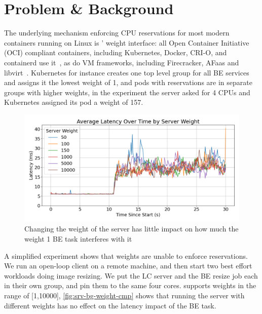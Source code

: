 
\section{Problem \& Background}

The underlying mechanism enforcing CPU reservations for most modern containers
running on Linux is \cgroups{}' weight interface: all Open Container Initiative
(OCI) compliant containers, including Kubernetes, Docker, CRI-O, and containerd
use it~\cite{oci-cgroups, docker-docs-cgroups, container-isolation-article}, as
do VM frameworks, including Firecracker, AFaas and
libvirt~\cite{firecracker-cgroups,afaas,libvirt-cgroups}. Kubernetes for
instance creates one top level group for all BE services and assigns it the
lowest weight of 1, and pods with reservations are in separate groups with
higher weights, \eg{} in the experiment the server asked for 4 CPUs and
Kubernetes assigned its pod a weight of 157.

\begin{figure}[t]
    \centering
    \includegraphics[width=\columnwidth]{graphs/srv-bg-weight-cmp-low.png}
    \caption{Changing the weight of the server has little impact on how much the
    weight 1 BE task interferes with it}\label{fig:srv-bg-weight-cmp}
\end{figure}


A simplified experiment shows that \cgroups{} weights are unable to enforce
reservations. We run an open-loop client on a remote machine, and then start two
best effort workloads doing image resizing. We put the LC server and the BE
resize job each in their own group, and pin them to the same four cores.
\cgroups{} supports weights in the range of [1,10000],
\autoref{fig:srv-bg-weight-cmp} shows that running the server with different
weights has no effect on the latency impact of the BE task.

